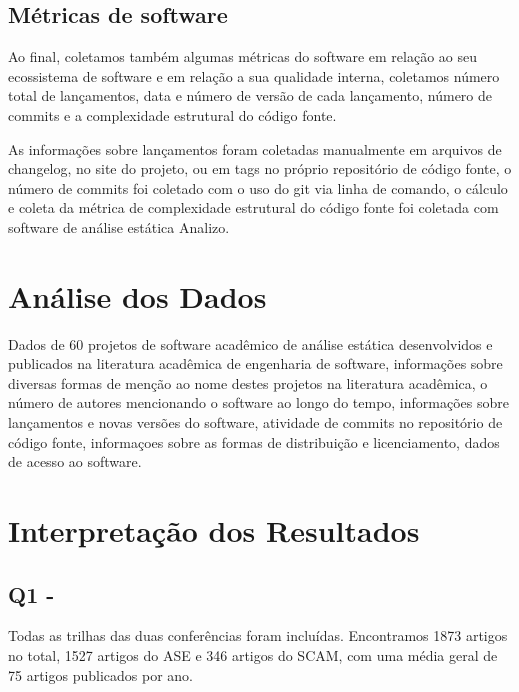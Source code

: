 \subsection{Métricas de software}

Ao final, coletamos também algumas métricas do software em relação ao seu
ecossistema de software e em relação a sua qualidade interna, coletamos número
total de lançamentos, data e número de versão de cada lançamento, número de
commits e a complexidade estrutural do código fonte.

As informações sobre lançamentos foram coletadas manualmente em arquivos de
changelog, no site do projeto, ou em tags no próprio repositório de código
fonte, o número de commits foi coletado com o uso do git via linha de comando,
o cálculo e coleta da métrica de complexidade estrutural do código fonte foi
coletada com software de análise estática Analizo.

\section{Análise dos Dados} %
\label{sec:study1:analysis}

Dados de 60 projetos de software acadêmico de análise estática desenvolvidos e
publicados na literatura acadêmica de engenharia de software, informações sobre
diversas formas de menção ao nome destes projetos na literatura acadêmica,
o número de autores mencionando o software ao longo do tempo, informações sobre
lançamentos e novas versões do software, atividade de commits no repositório
de código fonte, informaçoes sobre as formas de distribuição e licenciamento,
dados de acesso ao software.




\section{Interpretação dos Resultados} %
\label{sec:study1:interpretation}


\subsection{Q1 - \QuestaoUm}

Todas as trilhas das duas conferências foram incluídas. 
Encontramos 1873 artigos no total, 1527 artigos do ASE e 346
artigos do SCAM, 
com uma média geral de 75 artigos publicados por ano. 

